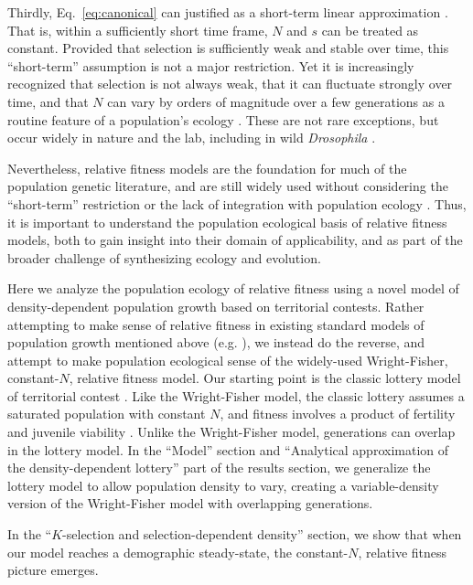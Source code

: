 \documentclass[11pt]{article}
\begin{document}
Thirdly, Eq.~\eqref{eq:canonical} can justified as a short-term linear approximation \cite[pp. 277]{ewens_2004}. That is, within a sufficiently short time frame, $N$ and $s$ can be treated as constant. Provided that selection is sufficiently weak and stable over time, this ``short-term''  assumption is not a major restriction. Yet it is increasingly recognized that selection is not always weak, that it can fluctuate strongly over time, and that $N$ can vary by orders of magnitude over a few generations as a routine feature of a population's ecology \citep{messer_2016}. These are not rare exceptions, but occur widely in nature and the lab, including in wild \textit{Drosophila} \citep{bergland_14}. 

Nevertheless, relative fitness models are the foundation for much of the population genetic literature, and are still widely used without considering the ``short-term'' restriction or the lack of integration with population ecology \citep{mallet_2012}. Thus, it is important to understand the population ecological basis of relative fitness models, both to gain insight into their domain of applicability, and as part of the broader challenge of synthesizing ecology and evolution.

Here we analyze the population ecology of relative fitness using a novel model of density-dependent population growth based on territorial contests. Rather attempting to make sense of relative fitness in existing standard models of population growth mentioned above (e.g. \citep{kimura1969natural,mallet_2012}), we instead do the reverse, and attempt to make population ecological sense of the widely-used Wright-Fisher, constant-$N$, relative fitness model. Our starting point is the classic lottery model of territorial contest \citep{sale_77,chesson_1981}. Like the Wright-Fisher model, the classic lottery assumes a saturated population with constant $N$, and fitness involves a product of fertility and juvenile viability \citep[pp. 185]{crow_1970}. Unlike the Wright-Fisher model, generations can overlap in the lottery model. In the ``Model'' section and ``Analytical approximation of the density-dependent lottery'' part of the results section, we generalize the lottery model to allow population density to vary, creating a variable-density version of the Wright-Fisher model with overlapping generations. 

In the ``$K$-selection and selection-dependent density'' section, we show that when our model reaches a demographic steady-state, the constant-$N$, relative fitness picture emerges. 
\end{document}
